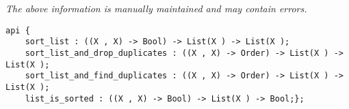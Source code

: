 \label{api:List\_Sort}

{\tiny \it The above information is manually maintained and may contain errors.}
\begin{verbatim}
api {
    sort_list : ((X , X) -> Bool) -> List(X ) -> List(X );
    sort_list_and_drop_duplicates : ((X , X) -> Order) -> List(X ) -> List(X );
    sort_list_and_find_duplicates : ((X , X) -> Order) -> List(X ) -> List(X );
    list_is_sorted : ((X , X) -> Bool) -> List(X ) -> Bool;};
\end{verbatim}
